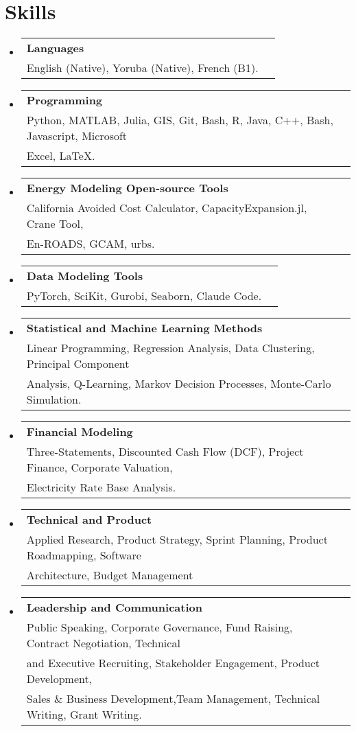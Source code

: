 \documentclass[A4, 11pt]{article}
\makeatletter
\newcommand{\CVSubheading}[4]{
  \vspace{-2pt}\item
    \begin{tabular*}{0.97\textwidth}[t]{l@{\extracolsep{\fill}}r}
      \textbf{#1} & #2 \\
      \small#3 & \small #4 \\
    \end{tabular*}\vspace{-7pt}
}
\newcommand{\CVSubHeadingListStart}{\begin{itemize}[leftmargin=0.5cm, label={}]}
\newcommand{\CVSubHeadingListEnd}{\end{itemize}}
\makeatother
\begin{document}
\begin{comment}
This section is compressed from the various skills sections that Euro CV
recommends.
\end{comment}

\section{Skills}

\CVSubHeadingListStart
    \CVSubheading
        {Languages}{}
        {English (Native), Yoruba (Native), French (B1).}{}

    \CVSubheading
        {Programming}{}
        {Python, MATLAB, Julia, GIS, Git, Bash, R, Java, C++, Bash, Javascript, Microsoft \\ Excel, LaTeX.}{}

    \CVSubheading
        {Energy Modeling Open-source Tools}{}
        {California Avoided Cost Calculator, CapacityExpansion.jl, Crane Tool,\\ En-ROADS, GCAM, urbs.}{}

    \CVSubheading
        {Data Modeling Tools}{}
        {PyTorch, SciKit, Gurobi, Seaborn, Claude Code.}{}


    \CVSubheading
        {Statistical and Machine Learning Methods}{}
        {Linear Programming, Regression Analysis, Data Clustering, Principal Component \\ Analysis, Q-Learning, Markov Decision Processes, Monte-Carlo Simulation.}{}

    \CVSubheading
        {Financial Modeling}{}
        {Three-Statements, Discounted Cash Flow (DCF), Project Finance, Corporate Valuation, \\ Electricity Rate Base Analysis.}{}

    \CVSubheading
        {Technical and Product}{}
        {Applied Research, Product Strategy, Sprint Planning, Product Roadmapping, Software \\ Architecture, Budget Management}{}

        
    \CVSubheading
        {Leadership and Communication}{}
        {Public Speaking, Corporate Governance, Fund Raising, Contract Negotiation, Technical \\ and Executive Recruiting, Stakeholder Engagement, Product Development, \\ Sales \& Business Development,Team Management, Technical Writing, Grant Writing.}{}
 \CVSubHeadingListEnd
\end{document}
